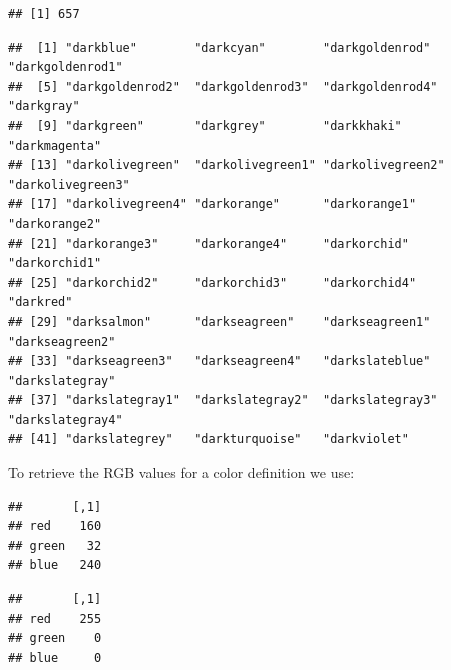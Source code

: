 \documentclass[krantz2]{krantz}\usepackage{knitr}
\begin{document}
\begin{knitrout}\footnotesize
{}\color{fgcolor}\begin{kframe}
\begin{alltt}
\hlstd{(}\hlstd{())}
\end{alltt}
\begin{verbatim}
## [1] 657
\end{verbatim}
\begin{alltt}
\hlstd{(}\hlstd{,}\hlstd{(),}  \hlstd{=} \hlstd{)}
\end{alltt}
\begin{verbatim}
##  [1] "darkblue"        "darkcyan"        "darkgoldenrod"   "darkgoldenrod1" 
##  [5] "darkgoldenrod2"  "darkgoldenrod3"  "darkgoldenrod4"  "darkgray"       
##  [9] "darkgreen"       "darkgrey"        "darkkhaki"       "darkmagenta"    
## [13] "darkolivegreen"  "darkolivegreen1" "darkolivegreen2" "darkolivegreen3"
## [17] "darkolivegreen4" "darkorange"      "darkorange1"     "darkorange2"    
## [21] "darkorange3"     "darkorange4"     "darkorchid"      "darkorchid1"    
## [25] "darkorchid2"     "darkorchid3"     "darkorchid4"     "darkred"        
## [29] "darksalmon"      "darkseagreen"    "darkseagreen1"   "darkseagreen2"  
## [33] "darkseagreen3"   "darkseagreen4"   "darkslateblue"   "darkslategray"  
## [37] "darkslategray1"  "darkslategray2"  "darkslategray3"  "darkslategray4" 
## [41] "darkslategrey"   "darkturquoise"   "darkviolet"
\end{verbatim}
\end{kframe}
\end{knitrout}

To retrieve the RGB values for a color definition we use:

\begin{knitrout}\footnotesize
{}\color{fgcolor}\begin{kframe}
\begin{alltt}
\hlstd{(}\hlstd{)}
\end{alltt}
\begin{verbatim}
##       [,1]
## red    160
## green   32
## blue   240
\end{verbatim}
\begin{alltt}
\hlstd{(}\hlstd{)}
\end{alltt}
\begin{verbatim}
##       [,1]
## red    255
## green    0
## blue     0
\end{verbatim}
\end{kframe}
\end{knitrout}
\end{document}
